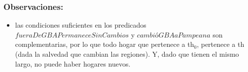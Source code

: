     \subsubsection{Observaciones:}
        \begin{itemize}
            \item las condiciones suficientes en los predicados $fueraDeGBAPermaneceSinCambios$ y $cambi$\'o$GBAaPampeana$
            son complementarias, por lo que todo hogar que pertenece a th$_{0}$, pertenece a th (dada la salvedad que cambian las regiones).
            Y, dado que tienen el mismo largo, no puede haber hogares nuevos.
        \end{itemize}
